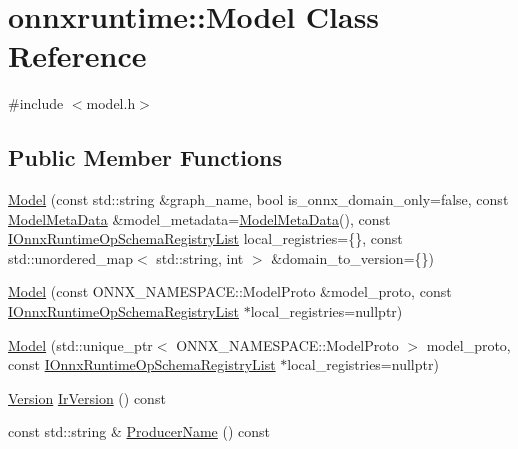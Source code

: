 \hypertarget{classonnxruntime_1_1Model}{}\section{onnxruntime\+:\+:Model Class Reference}
\label{classonnxruntime_1_1Model}


{\ttfamily \#include $<$model.\+h$>$}

\subsection*{Public Member Functions}
\begin{DoxyCompactItemize}
\item 
\mbox{\hyperlink{classonnxruntime_1_1Model_a26f33ca41f59c3865ec5961142b79b1b}{Model}} (const std\+::string \&graph\+\_\+name, bool is\+\_\+onnx\+\_\+domain\+\_\+only=false, const \mbox{\hyperlink{namespaceonnxruntime_a13519c21da77ccc594726b670276a266}{Model\+Meta\+Data}} \&model\+\_\+metadata=\mbox{\hyperlink{namespaceonnxruntime_a13519c21da77ccc594726b670276a266}{Model\+Meta\+Data}}(), const \mbox{\hyperlink{namespaceonnxruntime_a37a91305e7190e83fa9c66117a6a4746}{I\+Onnx\+Runtime\+Op\+Schema\+Registry\+List}} local\+\_\+registries=\{\}, const std\+::unordered\+\_\+map$<$ std\+::string, int $>$ \&domain\+\_\+to\+\_\+version=\{\})
\item 
\mbox{\hyperlink{classonnxruntime_1_1Model_a9c173259b1fbf481bd9dfdecbd34f7f0}{Model}} (const O\+N\+N\+X\+\_\+\+N\+A\+M\+E\+S\+P\+A\+C\+E\+::\+Model\+Proto \&model\+\_\+proto, const \mbox{\hyperlink{namespaceonnxruntime_a37a91305e7190e83fa9c66117a6a4746}{I\+Onnx\+Runtime\+Op\+Schema\+Registry\+List}} $\ast$local\+\_\+registries=nullptr)
\item 
\mbox{\hyperlink{classonnxruntime_1_1Model_ae64329b4d073efb3122d23b362c5b5f5}{Model}} (std\+::unique\+\_\+ptr$<$ O\+N\+N\+X\+\_\+\+N\+A\+M\+E\+S\+P\+A\+C\+E\+::\+Model\+Proto $>$ model\+\_\+proto, const \mbox{\hyperlink{namespaceonnxruntime_a37a91305e7190e83fa9c66117a6a4746}{I\+Onnx\+Runtime\+Op\+Schema\+Registry\+List}} $\ast$local\+\_\+registries=nullptr)
\item 
\mbox{\hyperlink{namespaceonnxruntime_ab7fae8d5830807c074def3bb8ae23cf1}{Version}} \mbox{\hyperlink{classonnxruntime_1_1Model_a6a7bb4216f04ffd4fec8b43129d304d4}{Ir\+Version}} () const
\item 
const std\+::string \& \mbox{\hyperlink{classonnxruntime_1_1Model_a9c6d90551fa5943bcd70f43b84f9cb4c}{Producer\+Name}} () const

\end{DoxyCompactItemize}

